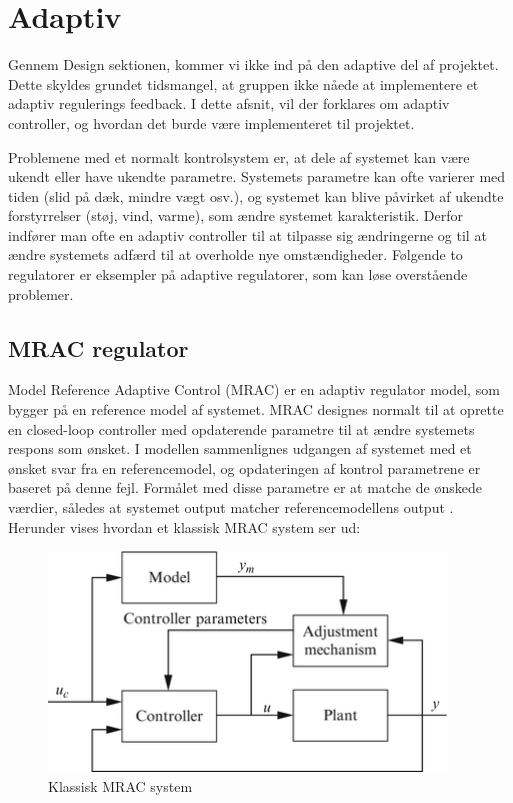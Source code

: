 \section{Adaptiv}

Gennem Design sektionen, kommer vi ikke ind på den adaptive del af projektet. Dette skyldes grundet tidsmangel, at gruppen ikke nåede at implementere et adaptiv regulerings feedback. I dette afsnit, vil der forklares om adaptiv controller, og hvordan det burde være implementeret til projektet. 

Problemene med et normalt kontrolsystem er, at dele af systemet kan være ukendt eller have ukendte parametre. Systemets parametre kan ofte varierer med tiden (slid på dæk, mindre vægt osv.), og systemet kan blive påvirket af ukendte forstyrrelser (støj, vind, varme), som ændre systemet karakteristik. Derfor indfører man ofte en adaptiv controller til at tilpasse sig ændringerne og til at ændre systemets adfærd til at overholde nye omstændigheder.
Følgende to regulatorer er eksempler på adaptive regulatorer, som kan løse overstående problemer.  


\subsection{MRAC regulator}
Model Reference Adaptive Control (MRAC) er en adaptiv regulator model, som bygger på en reference model af systemet.
MRAC designes normalt til at oprette en closed-loop controller med opdaterende parametre til at ændre systemets respons som ønsket. I modellen sammenlignes udgangen af systemet med et ønsket svar fra en referencemodel, og opdateringen af kontrol parametrene er baseret på denne fejl. Formålet med disse parametre er at matche de ønskede værdier, således at systemet output matcher referencemodellens output \cite{adaptive}.
Herunder vises hvordan et klassisk MRAC system ser ud:


\begin{figure}[H]
	\centering
	\includegraphics[width = 300pt]{figur/MRAC}
	\caption{Klassisk MRAC system}
	\label{fig:MRAC}
\end{figure}

